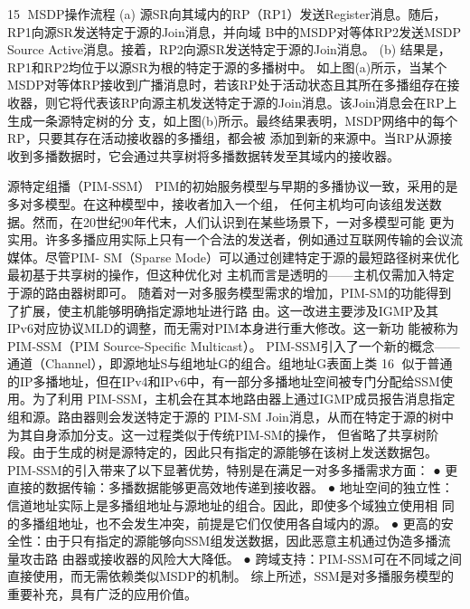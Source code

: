                                                                 15
MSDP操作流程
(a) 源SR向其域内的RP（RP1）发送Register消息。随后，RP1向源SR发送特定于源的Join消息，并向域
B中的MSDP对等体RP2发送MSDP Source Active消息。接着，RP2向源SR发送特定于源的Join消息。
(b) 结果是，RP1和RP2均位于以源SR为根的特定于源的多播树中。
如上图(a)所示，当某个MSDP对等体RP接收到广播消息时，若该RP处于活动状态且其所在多播组存在接
收器，则它将代表该RP向源主机发送特定于源的Join消息。该Join消息会在RP上生成一条源特定树的分
支，如上图(b)所示。最终结果表明，MSDP网络中的每个RP，只要其存在活动接收器的多播组，都会被
添加到新的来源中。当RP从源接收到多播数据时，它会通过共享树将多播数据转发至其域内的接收器。

源特定组播（PIM-SSM）
PIM的初始服务模型与早期的多播协议一致，采用的是多对多模型。在这种模型中，接收者加入一个组，
任何主机均可向该组发送数据。然而，在20世纪90年代末，人们认识到在某些场景下，一对多模型可能
更为实用。许多多播应用实际上只有一个合法的发送者，例如通过互联网传输的会议流媒体。尽管PIM-
SM（Sparse Mode）可以通过创建特定于源的最短路径树来优化最初基于共享树的操作，但这种优化对
主机而言是透明的——主机仅需加入特定于源的路由器树即可。
随着对一对多服务模型需求的增加，PIM-SM的功能得到了扩展，使主机能够明确指定源地址进行路
由。这一改进主要涉及IGMP及其IPv6对应协议MLD的调整，而无需对PIM本身进行重大修改。这一新功
能被称为PIM-SSM（PIM Source-Specific Multicast）。
PIM-SSM引入了一个新的概念——通道（Channel），即源地址S与组地址G的组合。组地址G表面上类
                                                          16
似于普通的IP多播地址，但在IPv4和IPv6中，有一部分多播地址空间被专门分配给SSM使用。为了利用
PIM-SSM，主机会在其本地路由器上通过IGMP成员报告消息指定组和源。路由器则会发送特定于源的
PIM-SM Join消息，从而在特定于源的树中为其自身添加分支。这一过程类似于传统PIM-SM的操作，
但省略了共享树阶段。由于生成的树是源特定的，因此只有指定的源能够在该树上发送数据包。
PIM-SSM的引入带来了以下显著优势，特别是在满足一对多多播需求方面：
  ● 更直接的数据传输：多播数据能够更高效地传递到接收器。
  ● 地址空间的独立性：信道地址实际上是多播组地址与源地址的组合。因此，即使多个域独立使用相
    同的多播组地址，也不会发生冲突，前提是它们仅使用各自域内的源。
  ● 更高的安全性：由于只有指定的源能够向SSM组发送数据，因此恶意主机通过伪造多播流量攻击路
    由器或接收器的风险大大降低。
  ● 跨域支持：PIM-SSM可在不同域之间直接使用，而无需依赖类似MSDP的机制。
    综上所述，SSM是对多播服务模型的重要补充，具有广泛的应用价值。

